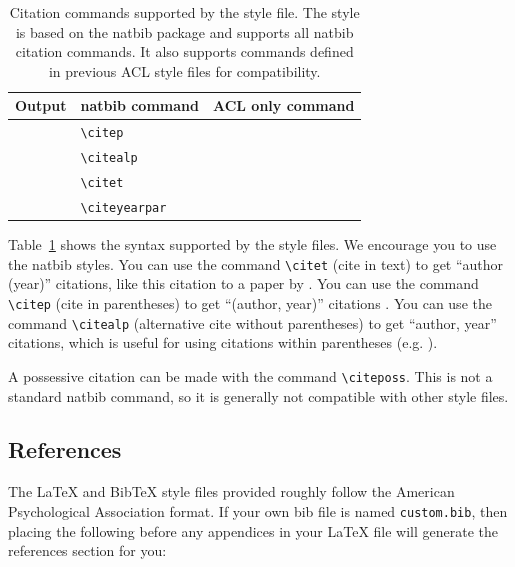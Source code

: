 \documentclass[11pt, a4paper, logo, copyright]{dmml}
\begin{document}
\begin{table}
  \centering
  \begin{tabular}{lll}
    \hline
    \textbf{Output}           & \textbf{natbib command} & \textbf{ACL only command} \\
    \hline
    \citep{Gusfield:97}       & \verb|\citep|           &                           \\
    \citealp{Gusfield:97}     & \verb|\citealp|         &                           \\
    \citet{Gusfield:97}       & \verb|\citet|           &                           \\
    \citeyearpar{Gusfield:97} & \verb|\citeyearpar|     &                           \\
    \hline
  \end{tabular}
  \caption{\label{citation-guide}
    Citation commands supported by the style file.
    The style is based on the natbib package and supports all natbib citation commands.
    It also supports commands defined in previous ACL style files for compatibility.
  }
\end{table}

Table~\ref{citation-guide} shows the syntax supported by the style files.
We encourage you to use the natbib styles.
You can use the command \verb|\citet| (cite in text) to get ``author (year)'' citations, like this citation to a paper by \citet{Gusfield:97}.
You can use the command \verb|\citep| (cite in parentheses) to get ``(author, year)'' citations \citep{Gusfield:97}.
You can use the command \verb|\citealp| (alternative cite without parentheses) to get ``author, year'' citations, which is useful for using citations within parentheses (e.g. \citealp{Gusfield:97}).

A possessive citation can be made with the command \verb|\citeposs|.
This is not a standard natbib command, so it is generally not compatible
with other style files.

\subsection{References}

\nocite{Ando2005,andrew2007scalable,rasooli-tetrault-2015}

The \LaTeX{} and Bib\TeX{} style files provided roughly follow the American Psychological Association format.
If your own bib file is named \texttt{custom.bib}, then placing the following before any appendices in your \LaTeX{} file will generate the references section for you:
\begin{quote}
\begin{verbatim}

\end{verbatim}
\end{quote}
\end{document}
